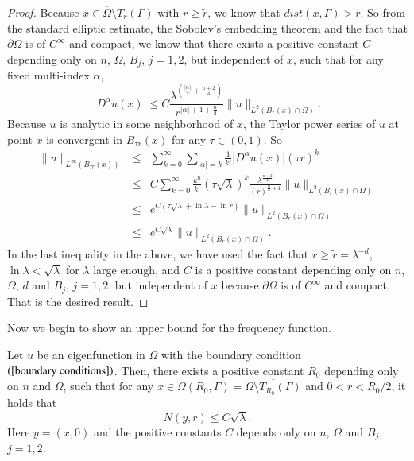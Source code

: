 \documentclass[a4paper, 12pt, onecolumn]{article} \textwidth 148mm
\begin{document}
\begin{proof}
Because $x\in\overline{\Omega}\setminus T_{r}(\Gamma)$ with $r\geq\widetilde{r}$, we know that $dist(x,\Gamma)>r$. So
from the standard elliptic estimate, the Sobolev's embedding theorem and the fact that $\partial\Omega$ is of $C^{\infty}$ and compact, we know that there exists a positive constant $C$ depending only on $n$, $\Omega$, $B_j$, $j=1,2$, but independent of $x$, such that for any fixed multi-index $\alpha$,
\begin{equation*}
|D^{\alpha}u(x)|\leq C\frac{\lambda^{(\frac{|\alpha|}{2}+\frac{n+2}{4})}}
{r^{|\alpha|+1+\frac{n}{2}}}\|u\|_{L^2(B_{r}(x)\cap\Omega)}.
\end{equation*}
Because $u$ is analytic in some neighborhood of $x$, the Taylor power series of $u$ at point $x$ is convergent in $B_{\tau r}(x)$ for any $\tau\in(0,1)$. So
\begin{eqnarray*}
\|u\|_{L^{\infty}(B_{\tau r}(x))}&\leq&\sum\limits_{k=0}^{\infty}\sum\limits_{|\alpha|=k}
\frac{1}{k!}|D^{\alpha}u(x)|(\tau r)^{k}\\&\leq&
C\sum\limits_{k=0}^{\infty}\frac{k^n}{k!}(\tau\sqrt{\lambda})^k\frac{\lambda^{\frac{n+2}{4}}}{(r)^{\frac{n}{2}+1}}
\|u\|_{L^2(B_{r}(x)\cap\Omega)}
\\&\leq&e^{C(\tau\sqrt{\lambda}+\ln\lambda-\ln r)}\|u\|_{L^2(B_{r}(x)\cap\Omega)}
\\&\leq&e^{C\sqrt{\lambda}}\|u\|_{L^2(B_{r}(x)\cap\Omega)}.
\end{eqnarray*}
In the last inequality in the above, we have used the fact that $r\geq\widetilde{r}=\lambda^{-d}$, $\ln\lambda<\sqrt{\lambda}$ for $\lambda$ large enough, and
$C$ is a positive constant depending only on $n$, $\Omega$, $d$ and $B_j$, $j=1,2$, but independent of $x$ because $\partial\Omega$ is of $C^{\infty}$ and compact.
That is the desired result.
\end{proof}

Now we begin to show an upper bound for the frequency function.

\begin{theorem}\label{upper bound for the frequency function}
Let $u$ be an eigenfunction in $\Omega$ with the boundary condition $(\ref{boundary conditions})$.
Then, there exists a positive constant $R_0$ depending only on $n$ and $\Omega$, such that for any $x\in\Omega(R_0,\Gamma)=\overline{\Omega\setminus T_{R_0}(\Gamma)}$ and $0<r<R_0/2$, it holds that
\begin{equation}
N(y,r)\leq C\sqrt{\lambda}.
\end{equation}
Here $y=(x,0)$ and the positive constants $C$ depends only on $n$, $\Omega$ and $B_j$, $j=1,2$.
\end{theorem}
\end{document}
